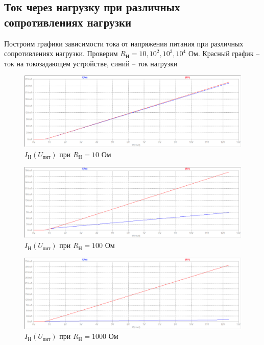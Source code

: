 \documentclass[a4paper, 12pt]{article}
\begin{document}
    \subsection{Ток через нагрузку при различных сопротивлениях нагрузки}
    Построим графики зависимости тока от напряжения питания при различных сопротивлениях нагрузки.
    Проверим $R_\text{Н}=10,10^2,10^3,10^4$ Ом. Красный график -- ток на токозадающем устройстве,
    синий -- ток нагрузки
    \begin{figure}[H]
        \centering
        \includegraphics[scale=0.46]{1task_Iн(Vпит)_Rн10.png}
        \captionsetup{skip=0pt}
        \caption{$I_\text{Н}\left( U_\text{пит} \right)$ при $R_\text{Н}=10$ Ом}
        \label{fig:1task_InVlR10}
    \end{figure}
    \begin{figure}[H]
        \centering
        \includegraphics[scale=0.46]{1task_Iн(Vпит)_Rн100.png}
        \captionsetup{skip=0pt}
        \caption{$I_\text{Н}\left( U_\text{пит} \right)$ при $R_\text{Н}=100$ Ом}
        \label{fig:1task_InVlR100}
    \end{figure}
    \begin{figure}[H]
        \centering
        \includegraphics[scale=0.46]{1task_Iн(Vпит)_Rн1000.png}
        \captionsetup{skip=0pt}
        \caption{$I_\text{Н}\left( U_\text{пит} \right)$ при $R_\text{Н}=1000$ Ом}
        \label{fig:1task_InVlR1000}
    \end{figure}
\end{document}
